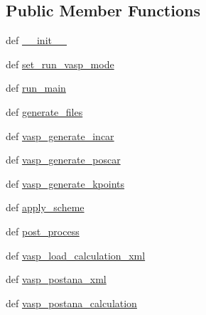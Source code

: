 \subsection*{Public Member Functions}
\begin{DoxyCompactItemize}
\item 
def \hyperlink{class_d_f_t___k_i_t_1_1calculator_1_1_v_a_s_p_1_1calculator___v_a_s_p_aa93fe1d0817f60fec3803e01b395ea29}{\+\_\+\+\_\+init\+\_\+\+\_\+}
\item 
def \hyperlink{class_d_f_t___k_i_t_1_1calculator_1_1_v_a_s_p_1_1calculator___v_a_s_p_a2b324b0463ee70a4771a37aa6602de0f}{set\+\_\+run\+\_\+vasp\+\_\+mode}
\item 
def \hyperlink{class_d_f_t___k_i_t_1_1calculator_1_1_v_a_s_p_1_1calculator___v_a_s_p_a9c42b72766e542209e2a71188c73a05c}{run\+\_\+main}
\item 
def \hyperlink{class_d_f_t___k_i_t_1_1calculator_1_1_v_a_s_p_1_1calculator___v_a_s_p_a14129668e5520b33683f54e1b1b46d48}{generate\+\_\+files}
\item 
def \hyperlink{class_d_f_t___k_i_t_1_1calculator_1_1_v_a_s_p_1_1calculator___v_a_s_p_acaf8bf95391a54226d23ca036375fdc7}{vasp\+\_\+generate\+\_\+incar}
\item 
def \hyperlink{class_d_f_t___k_i_t_1_1calculator_1_1_v_a_s_p_1_1calculator___v_a_s_p_a9faee2a517349479744f59f977a965f2}{vasp\+\_\+generate\+\_\+poscar}
\item 
def \hyperlink{class_d_f_t___k_i_t_1_1calculator_1_1_v_a_s_p_1_1calculator___v_a_s_p_a338715e224e54b8c941ef3348e672a86}{vasp\+\_\+generate\+\_\+kpoints}
\item 
def \hyperlink{class_d_f_t___k_i_t_1_1calculator_1_1_v_a_s_p_1_1calculator___v_a_s_p_a2c3605f1f29f24ed066b69b93ce9c6c3}{apply\+\_\+scheme}
\item 
def \hyperlink{class_d_f_t___k_i_t_1_1calculator_1_1_v_a_s_p_1_1calculator___v_a_s_p_a7ffb25fd49a4631987e84b0bfb41d5cf}{post\+\_\+process}
\item 
def \hyperlink{class_d_f_t___k_i_t_1_1calculator_1_1_v_a_s_p_1_1calculator___v_a_s_p_a4cdeea8dcddf4f9e0b2293803aa5c10a}{vasp\+\_\+load\+\_\+calculation\+\_\+xml}
\item 
def \hyperlink{class_d_f_t___k_i_t_1_1calculator_1_1_v_a_s_p_1_1calculator___v_a_s_p_aadcb71e59295bdf573802252dcc55682}{vasp\+\_\+postana\+\_\+xml}
\item 
def \hyperlink{class_d_f_t___k_i_t_1_1calculator_1_1_v_a_s_p_1_1calculator___v_a_s_p_a084c108ca41f4875f171ddd71265b2f3}{vasp\+\_\+postana\+\_\+calculation}
\end{DoxyCompactItemize}

